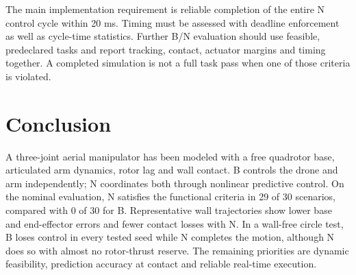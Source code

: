 \documentclass[conference]{IEEEtran}
\begin{document}
The main implementation requirement is reliable completion of the entire N control cycle within 20 ms. Timing must be assessed with deadline enforcement as well as cycle-time statistics. Further B/N evaluation should use feasible, predeclared tasks and report tracking, contact, actuator margins and timing together. A completed simulation is not a full task pass when one of those criteria is violated.

\section{Conclusion}
A three-joint aerial manipulator has been modeled with a free quadrotor base, articulated arm dynamics, rotor lag and wall contact. B controls the drone and arm independently; N coordinates both through nonlinear predictive control. On the nominal evaluation, N satisfies the functional criteria in 29 of 30 scenarios, compared with 0 of 30 for B. Representative wall trajectories show lower base and end-effector errors and fewer contact losses with N. In a wall-free circle test, B loses control in every tested seed while N completes the motion, although N does so with almost no rotor-thrust reserve. The remaining priorities are dynamic feasibility, prediction accuracy at contact and reliable real-time execution.
\end{document}

